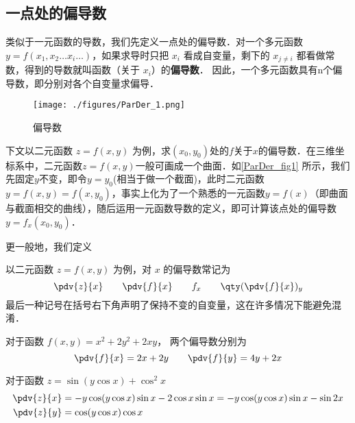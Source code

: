 
\subsection{一点处的偏导数}
类似于一元函数的导数，我们先定义一点处的偏导数．对一个多元函数 $y = f(x_1, x_2 \dots x_i \dots)$，如果求导时只把 $x_i$ 看成自变量，剩下的 $x_{j \ne i}$ 都看做常数，得到的导数就叫函数（关于 $x_i$）的\textbf{偏导数}． 因此，一个多元函数具有n个偏导数，即分别对各个自变量求偏导．

\begin{figure}[ht]
\centering
\texttt{[image: ./figures/ParDer\_1.png]}
\caption{偏导数} \label{ParDer_fig1}
\end{figure}

下文以二元函数 $z=f(x,y)$ 为例，求$(x_0,y_0)$处的$f$关于$x$的偏导数．在三维坐标系中，二元函数$z=f(x,y)$一般可画成一个曲面．如\autoref{ParDer_fig1} 所示，我们先固定$y$不变，即令$y=y_0$(相当于做一个截面)，此时二元函数$y=f(x,y)=f(x,y_0)$，事实上化为了一个熟悉的一元函数$y=f(x)$（即曲面与截面相交的曲线），随后运用一元函数导数的定义，即可计算该点处的偏导数$y=f_x(x_0,y_0)$．

更一般地，我们定义


以二元函数 $z=f(x,y)$ 为例，对 $x$ 的偏导数常记为
\begin{equation}\label{ParDer_eq1}
\pdv{z}{x} \qquad \pdv{f}{x} \qquad f_x  \qquad \qty(\pdv{f}{x})_y
\end{equation}
最后一种记号在括号右下角声明了保持不变的自变量，这在许多情况下能避免混淆．

\begin{example}{}\label{ParDer_ex1}
对于函数 $f(x,y) = x^2 + 2 y^2 + 2xy$， 两个偏导数分别为
\begin{equation}
\pdv{f}{x} = 2x + 2y  \qquad  \pdv{f}{y} = 4y + 2x
\end{equation}
\end{example}

\begin{example}{}\label{ParDer_ex2}
对于函数 $z = \sin (y\cos x) + \cos ^2 x$
\begin{equation}
\begin{aligned}
\pdv{z}{x} &=  - y\cos (y\cos x)\sin x - 2\cos x\sin x =  - y\cos (y\cos x)\sin x - \sin 2x\\
\pdv{z}{y} &= \cos (y\cos x)\cos x
\end{aligned}
\end{equation}
\end{example}

